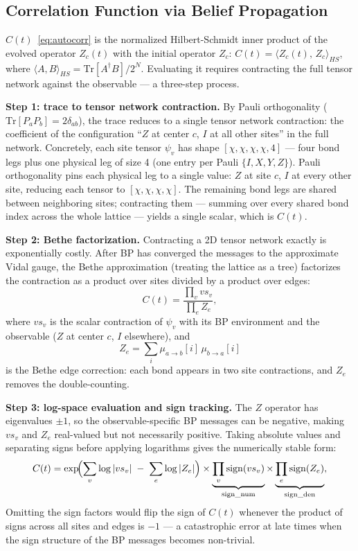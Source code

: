 \documentclass[11pt]{article}
\begin{document}
\subsection{Correlation Function via Belief Propagation}

$C(t)$~\eqref{eq:autocorr} is the normalized Hilbert-Schmidt inner product of
the evolved operator $Z_c(t)$ with the initial operator $Z_c$:
$C(t) = \langle Z_c(t),\, Z_c \rangle_{HS}$, where
$\langle A, B\rangle_{HS} = \mathrm{Tr}[A^\dagger B]/2^N$.
Evaluating it requires contracting the full tensor network against the observable —
a three-step process.

\textbf{Step 1: trace to tensor network contraction.}
By Pauli orthogonality ($\mathrm{Tr}[P_a P_b] = 2\delta_{ab}$), the trace
reduces to a single tensor network contraction: the coefficient of the
configuration ``$Z$ at center $c$, $I$ at all other sites'' in the full network.
Concretely, each site tensor $\psi_v$ has shape $[\chi,\chi,\chi,\chi,4]$ ---
four bond legs plus one physical leg of size 4 (one entry per Pauli $\{I,X,Y,Z\}$).
Pauli orthogonality pins each physical leg to a single value: $Z$ at site $c$,
$I$ at every other site, reducing each tensor to $[\chi,\chi,\chi,\chi]$.
The remaining bond legs are shared between neighboring sites; contracting them ---
summing over every shared bond index across the whole lattice --- yields a single
scalar, which is $C(t)$.

\textbf{Step 2: Bethe factorization.}
Contracting a 2D tensor network exactly is exponentially costly.
After BP has converged the messages to the approximate Vidal gauge, the
Bethe approximation (treating the lattice as a tree) factorizes the contraction
as a product over sites divided by a product over edges:
\begin{equation}
 C(t) = \frac{\displaystyle\prod_v vs_v}{\displaystyle\prod_e Z_e},
 \label{eq:bethe_raw}
\end{equation}
where $vs_v$ is the scalar contraction of $\psi_v$ with its BP environment and
the observable ($Z$ at center $c$, $I$ elsewhere), and
\begin{equation}
 Z_e = \sum_i \mu_{a \to b}[i]\, \mu_{b \to a}[i]
 \label{eq:ze}
\end{equation}
is the Bethe edge correction: each bond appears in two site contractions, and
$Z_e$ removes the double-counting.

\textbf{Step 3: log-space evaluation and sign tracking.}
The $Z$ operator has eigenvalues $\pm 1$, so the observable-specific BP messages
can be negative, making $vs_v$ and $Z_e$ real-valued but not necessarily positive.
Taking absolute values and separating signs before applying logarithms gives the
numerically stable form:
\begin{equation}
 C(t) = \exp\!\Bigl(\sum_v \log|vs_v| \;-\; \sum_e \log|Z_e|\Bigr)
 \times \underbrace{\prod_v \mathrm{sign}(vs_v)}_{\mathrm{sign\_num}}
 \times \underbrace{\prod_e \mathrm{sign}(Z_e)}_{\mathrm{sign\_den}},
 \label{eq:bethe}
\end{equation}
Omitting the sign factors would flip the sign of $C(t)$ whenever the product
of signs across all sites and edges is $-1$ — a catastrophic error at late times
when the sign structure of the BP messages becomes non-trivial.
\end{document}
